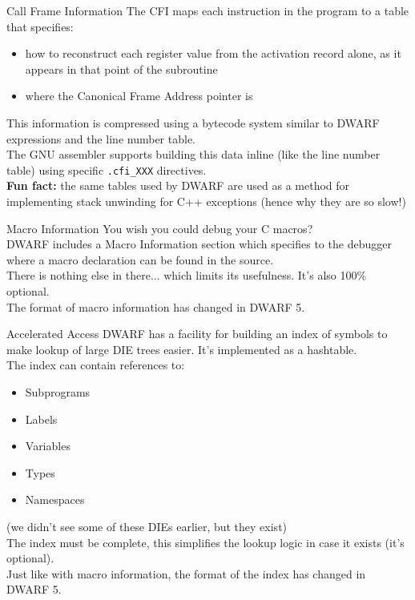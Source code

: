 \begin{frame}{Call Frame Information}
The CFI maps each instruction in the program to a table
that specifies:\\
\medskip
\begin{itemize}
\item how to reconstruct each register value from the activation record
	alone, as it appears in that point of the subroutine
\item where the Canonical Frame Address pointer is
\end{itemize}
\bigskip
This information is compressed using a bytecode system similar to DWARF
expressions and the line number table.\\
\medskip
The GNU assembler supports building this data inline (like the line number table)
using specific \texttt{.cfi\_XXX} directives.\\
\bigskip
\textbf{Fun fact:} the same tables used by DWARF are used as a method for implementing
stack unwinding for C++ exceptions (hence why they are so slow!)
\end{frame}


\begin{frame}{Macro Information}
You wish you could \alert{debug your C macros}?\\
\medskip
DWARF includes a \alert{Macro Information} section which specifies to the debugger
where a macro declaration can be found in the source.\\
\medskip
There is nothing else in there... which limits its usefulness. It's also
100\% optional.\\
\medskip
The format of macro information has changed in DWARF 5.
\end{frame}


\begin{frame}{Accelerated Access}
DWARF has a facility for building an index of symbols to make lookup of
large DIE trees easier. It's implemented as a hashtable.\\
\medskip
The index can contain references to:
\begin{itemize}
\item Subprograms
\item Labels
\item Variables
\item Types
\item Namespaces
\end{itemize}
(we didn't see some of these DIEs earlier, but they exist)\\
\medskip
The index must be complete, this simplifies the lookup logic in case it exists
(it's optional).\\
\medskip
Just like with macro information, the format of the index has changed in DWARF 5.
\end{frame}

